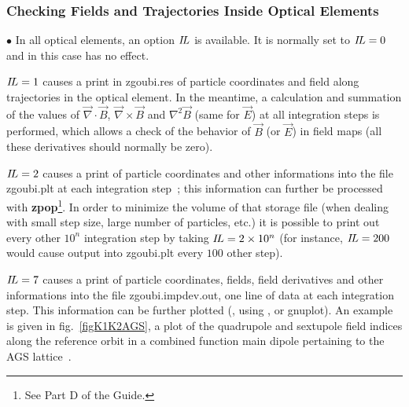 \subsubsection{Checking Fields and Trajectories Inside Optical Elements}  \label{sec4.6.1}

{\small $\bullet$} In all optical elements, an option $ I\!L $ is available.  It
is normally set to $I\!L =0$ and in this case has no effect.

\noindent $ I\!L=1 $ causes a print  in zgoubi.res  of particle 
coordinates and field
along trajectories in the optical element.  In the meantime, a calculation and summation of
the values of $ \vec  \nabla \cdot\vec  B$, 
 $ \vec  \nabla \times\vec  B $ and $ \nabla^2\vec  B $ (same for $\vec E$) at all 
integration steps is performed, which allows a check of the behavior of 
$ \vec  B $ (or $ \vec  E $) in field maps (all these derivatives should normally be zero).

\medskip

\noindent $ I\!L=2 $ causes a print   of particle coordinates and other 
informations into the file  zgoubi.plt at each integration step~; this information 
 can further be processed with 
\textbf{zpop}\footnote{See Part D of the Guide.}. In order to minimize  the volume of 
that storage file (when dealing with small step size, large number of particles, etc.) it is possible 
to print out  every other $10^n$ integration step by taking $ I\!L=2 \times 10^n $ (for instance, 
 $ I\!L=200 $ would cause output into zgoubi.plt every $100$ other step). 

\medskip

\noindent $ I\!L=7 $ causes a print   of particle coordinates, fields, field derivatives  and other 
informations into the file  zgoubi.impdev.out, 
one line of data  at each integration step. This information 
 can be further  plotted (\eg, using \zpop, or gnuplot). 
An example is given in fig.~\ref{figK1K2AGS}, a plot of the quadrupole and sextupole 
field indices along the reference orbit 
in a combined function main dipole pertaining to the AGS lattice~\cite{AGSModel}. 

